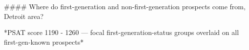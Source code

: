 #### Where do first-generation and non-first-generation prospects come from, Detroit area?

*PSAT score 1190 - 1260 — focal first-generation-status groups overlaid on all first-gen-known prospects*
